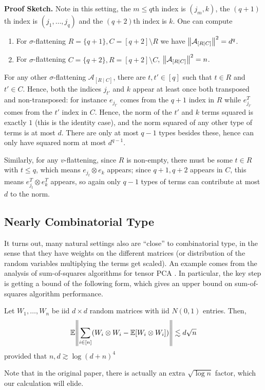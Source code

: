 \textbf{Proof Sketch.}
Note in this setting, 
the $m \le q$th index is $(j_m, k)$,
the $(q + 1)$th index is $(j_1, \dots, j_q)$ and the $(q + 2)$th index is $k$.
One can compute
\begin{enumerate}
    \item For $\sigma$-flattening $R = \{q + 1\}, C = [q + 2] \setminus R$ we have  $\norm{\mathcal{A}_{[R \mid C]}}^2 = d^q$.
    \item For $\sigma$-flattening $C = \{q + 2\}, R = [q + 2] \setminus C$,  $\norm{\mathcal{A}_{[R \mid C]}}^2 = n$.
\end{enumerate}
For any other $\sigma$-flattening $\mathcal{A}_{[R \mid C]}$, there are $t, t' \in [q]$ such that $t \in R$
and $t' \in C$. Hence, both the indices $j_{t'}$ and $k$ appear at least once both transposed and non-transposed:
for instance $e_{j_{t'}}$ comes from the $q + 1$ index in $R$ while $e_{j_{t'}}^T$ comes from the $t'$ index in $C$.
Hence,
the norm of the $t'$ and $k$ terms squared is exactly $1$ (this is the identity case), and the norm squared of any other type of terms is at most $d$.
There are only at most $q - 1$ types besides these, hence can only have squared norm at most $d^{q - 1}$.

Similarly, for any $v$-flattening, since $R$ is non-empty, there must be some $t \in R$
with $t \le q$, which means $e_{j_t}\otimes e_k$ appears; since $q + 1, q+2$ appears in $C$,
this means $e_{j_t}^T \otimes e_k^T$ appears, so again only $q - 1$ types of terms can contribute at most $d$ to the norm.


\subsection{Nearly Combinatorial Type}
It turns out, many natural settings also are ``close'' to combinatorial type, in the sense
that they have weights on the different matrices (or distribution of the random variables multiplying the terms get scaled).
An example comes from the analysis of sum-of-squares algorithms for tensor PCA \cite{hopkinssos}. In particular, the key step
is getting a bound of the following form, which gives an upper bound on sum-of-squares algorithm performance.
\begin{theorem} Let $W_1, \dots, W_n$ be iid $d \times d$ random matrices with iid $N(0, 1)$ entries. Then,
\[ \mathbb{E} \norm{\sum_{i \in [n]} (W_i \otimes W_i - \mathbb{E}[W_i \otimes W_i])} \lesssim d\sqrt{n} \]
provided that $n, d \gtrsim \log(d + n)^4$
\end{theorem}
Note that in the original paper, there is actually an extra $\sqrt{\log n}$ factor, which our calculation will elide.

